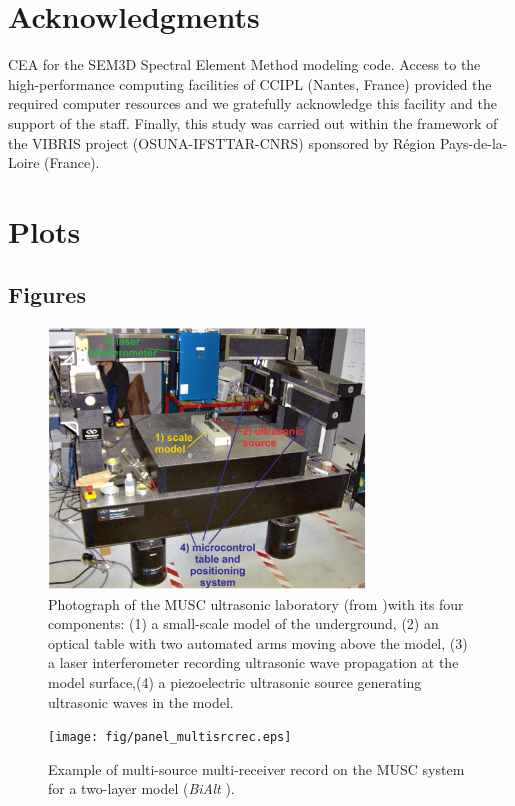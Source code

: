 \documentclass[manuscript,revised]{geophysics}
\newcommand{\bialt}{\textit{BiAlt} }
\begin{document}
\section*{Acknowledgments}

\noindent CEA for the SEM3D Spectral Element Method modeling code. Access to the high-performance computing facilities of CCIPL (Nantes, France) provided the required computer resources and we gratefully acknowledge this facility and the support of the staff. Finally, this study was carried out within the framework of the VIBRIS project (OSUNA-IFSTTAR-CNRS) sponsored by R\'egion Pays-de-la-Loire (France).   

\section{Plots}

\subsection*{Figures}

\begin{figure}[!h]
	\centering
	\includegraphics[width=0.75\textwidth]{fig/panel_musc_bench.eps}
	\caption{Photograph of the MUSC ultrasonic laboratory (from \citet{Bretaudeau_FWI_2013} )with its four components: (1) a small-scale model of the underground, (2) an optical table with two automated arms moving above the model, (3) a laser interferometer recording ultrasonic wave propagation	at the model surface,(4) a piezoelectric ultrasonic source generating ultrasonic waves in the model.}
	\label{panel_musc_bench}
\end{figure}

\begin{figure}[!h]
	\centering
	\texttt{[image: fig/panel\_multisrcrec.eps]}
	\caption{Example of multi-source multi-receiver record on the MUSC system for a two-layer model (\bialt).}
	\label{panel_multisrcrec}
\end{figure}
\end{document}
